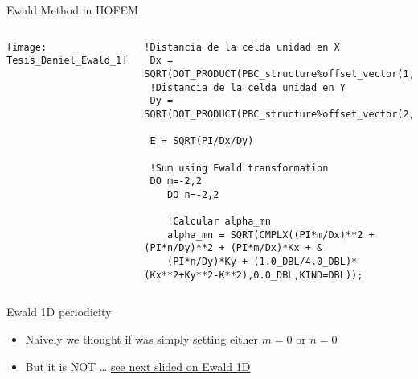 %
%


    \begin{frame}{\GreenTEw}

    
    \begin{block}{Ewald Method in HOFEM}
    \begin{columns}[T]
      \texttt{[image: Tesis\_Daniel\_Ewald\_1]} 
      \begin{lstlisting}[style=myFORTRANcodeS,basicstyle=\ttfamily\tiny]
!Distancia de la celda unidad en X
 Dx = SQRT(DOT_PRODUCT(PBC_structure%offset_vector(1,:),PBC_structure%offset_vector(1,:)))
 !Distancia de la celda unidad en Y
 Dy = SQRT(DOT_PRODUCT(PBC_structure%offset_vector(2,:),PBC_structure%offset_vector(2,:)))
    
 E = SQRT(PI/Dx/Dy)

 !Sum using Ewald transformation
 DO m=-2,2
    DO n=-2,2

    !Calcular alpha_mn
    alpha_mn = SQRT(CMPLX((PI*m/Dx)**2 + (PI*n/Dy)**2 + (PI*m/Dx)*Kx + &
    (PI*n/Dy)*Ky + (1.0_DBL/4.0_DBL)*(Kx**2+Ky**2-K**2),0.0_DBL,KIND=DBL));
      \end{lstlisting}
    \end{columns}
  \end{block}


  \begin{block}{Ewald 1D periodicity}
    \begin{itemize}
    \item Naively we thought if was simply setting
      either $m=0$ or $n=0$
    \item \alert{But it is NOT} \ldots
      \hyperlink{Ewald1D}{see next slided on Ewald 1D}
    \end{itemize}
  \end{block}

  \end{frame}

  
